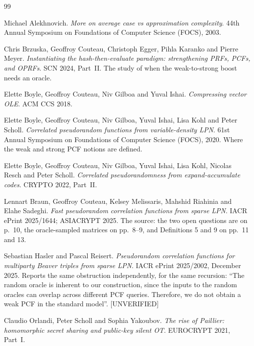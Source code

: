\documentclass{aicr-conjecture}
\begin{document}
\begin{aicrbibliography}{99}

Michael Alekhnovich.
\emph{More on average case vs approximation complexity}.
44th Annual Symposium on Foundations of Computer Science (FOCS), 2003.

Chris Brzuska, Geoffroy Couteau, Christoph Egger, Pihla Karanko and
Pierre Meyer.
\emph{Instantiating the hash-then-evaluate paradigm: strengthening PRFs,
PCFs, and OPRFs}.
SCN 2024, Part~II\@.
The study of when the weak-to-strong boost needs an oracle.

Elette Boyle, Geoffroy Couteau, Niv Gilboa and Yuval Ishai.
\emph{Compressing vector OLE}.
ACM CCS 2018.

Elette Boyle, Geoffroy Couteau, Niv Gilboa, Yuval Ishai, Lisa Kohl and
Peter Scholl.
\emph{Correlated pseudorandom functions from variable-density LPN}.
61st Annual Symposium on Foundations of Computer Science (FOCS), 2020.
Where the weak and strong PCF notions are defined.

Elette Boyle, Geoffroy Couteau, Niv Gilboa, Yuval Ishai, Lisa Kohl,
Nicolas Resch and Peter Scholl.
\emph{Correlated pseudorandomness from expand-accumulate codes}.
CRYPTO 2022, Part~II\@.

Lennart Braun, Geoffroy Couteau, Kelsey Melissaris, Mahshid Riahinia and
Elahe Sadeghi.
\emph{Fast pseudorandom correlation functions from sparse LPN}.
IACR ePrint 2025/1644; ASIACRYPT 2025.
The source: the two open questions are on p.\ 10, the oracle-sampled
matrices on pp.\ 8--9, and Definitions 5 and 9 on pp.\ 11 and 13.

Sebastian Hasler and Pascal Reisert.
\emph{Pseudorandom correlation functions for multiparty Beaver triples
from sparse LPN}.
IACR ePrint 2025/2002, December 2025.
Reports the same obstruction independently, for the same recursion:
``The random oracle is inherent to our construction, since the inputs to
the random oracles can overlap across different PCF queries. Therefore,
we do not obtain a weak PCF in the standard model''.
[UNVERIFIED]

Claudio Orlandi, Peter Scholl and Sophia Yakoubov.
\emph{The rise of Paillier: homomorphic secret sharing and public-key
silent OT}.
EUROCRYPT 2021, Part~I\@.

\end{aicrbibliography}
\end{document}
